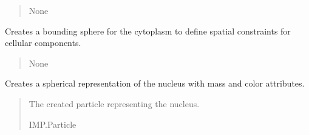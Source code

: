 \documentclass[letterpaper,10pt,english]{sphinxmanual}
\begin{document}
\begin{fulllineitems}
\begin{fulllineitems}
\begin{quote}
\begin{description}
\sphinxAtStartPar
None

\end{description}\end{quote}

\end{fulllineitems}


\begin{fulllineitems}
\label{\detokenize{src:src.System_Class.System.create_cell_bounding_sphere}}
\pysigstartsignatures
{}
\pysigstopsignatures
\sphinxAtStartPar
Creates a bounding sphere for the cytoplasm to define spatial constraints for cellular components.
\begin{quote}\begin{description}
\sphinxAtStartPar
{}

\sphinxAtStartPar
None

\end{description}\end{quote}

\end{fulllineitems}


\begin{fulllineitems}
\label{\detokenize{src:src.System_Class.System.create_nucleus}}
\pysigstartsignatures
{}
\pysigstopsignatures
\sphinxAtStartPar
Creates a spherical representation of the nucleus with mass and color attributes.
\begin{quote}\begin{description}
\sphinxAtStartPar
{}

\sphinxAtStartPar
The created particle representing the nucleus.

\sphinxAtStartPar
IMP.Particle

\end{description}\end{quote}


\end{fulllineitems}
\end{fulllineitems}
\end{document}
